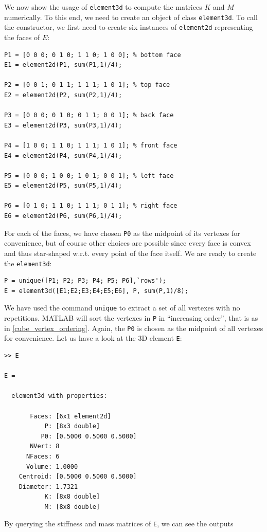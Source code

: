 \documentclass[a4paper]{article}
\begin{document}
\noindent
We now show the usage of \texttt{element3d} to compute the matrices $K$ and $M$ numerically. To this end, we need to create an object of class \texttt{element3d}. To call the constructor, we first need to create six instances of \texttt{element2d} representing the faces of $E$:

\begin{lstlisting}
P1 = [0 0 0; 0 1 0; 1 1 0; 1 0 0]; % bottom face
E1 = element2d(P1, sum(P1,1)/4);

P2 = [0 0 1; 0 1 1; 1 1 1; 1 0 1]; % top face
E2 = element2d(P2, sum(P2,1)/4);

P3 = [0 0 0; 0 1 0; 0 1 1; 0 0 1]; % back face
E3 = element2d(P3, sum(P3,1)/4);

P4 = [1 0 0; 1 1 0; 1 1 1; 1 0 1]; % front face
E4 = element2d(P4, sum(P4,1)/4);

P5 = [0 0 0; 1 0 0; 1 0 1; 0 0 1]; % left face
E5 = element2d(P5, sum(P5,1)/4);

P6 = [0 1 0; 1 1 0; 1 1 1; 0 1 1]; % right face
E6 = element2d(P6, sum(P6,1)/4);
\end{lstlisting}

\noindent
For each of the faces,  we have chosen \texttt{P0} as the midpoint of its vertexes for convenience, but of course other choices are possible since every face is convex and thus star-shaped w.r.t. every point of the face itself.  We are ready to create the \texttt{element3d}:
\begin{lstlisting}
P = unique([P1; P2; P3; P4; P5; P6],`rows');
E = element3d([E1;E2;E3;E4;E5;E6], P, sum(P,1)/8);
\end{lstlisting}
We have used the command \texttt{unique} to extract a set of all vertexes with no repetitions. MATLAB will sort the vertexes in \texttt{P} in ``increasing order'', that is as in \eqref{cube_vertex_ordering}.  Again, the \texttt{P0} is chosen as the midpoint of all vertexes for convenience. Let us have a look at the 3D element \texttt{E}:
\begin{lstlisting}
>> E

E = 

  element3d with properties:

       Faces: [6x1 element2d]
           P: [8x3 double]
          P0: [0.5000 0.5000 0.5000]
       NVert: 8
      NFaces: 6
      Volume: 1.0000
    Centroid: [0.5000 0.5000 0.5000]
    Diameter: 1.7321
           K: [8x8 double]
           M: [8x8 double]
\end{lstlisting}

\noindent
By querying the stiffness and mass matrices of \texttt{E}, we can see the outputs
\end{document}
